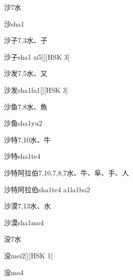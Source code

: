 \begin{entry}{沙}{7}{⽔}
  \begin{phonetics}{沙}{sha1}
  \end{phonetics}
\end{entry}

\begin{entry}{沙子}{7,3}{⽔、⼦}
  \begin{phonetics}{沙子}{sha1 zi5}[][HSK 3]
  \end{phonetics}
\end{entry}

\begin{entry}{沙发}{7,5}{⽔、⼜}
  \begin{phonetics}{沙发}{sha1fa1}[][HSK 3]
  \end{phonetics}
\end{entry}

\begin{entry}{沙鱼}{7,8}{⽔、⿂}
  \begin{phonetics}{沙鱼}{sha1yu2}
  \end{phonetics}
\end{entry}

\begin{entry}{沙特}{7,10}{⽔、⽜}
  \begin{phonetics}{沙特}{sha1te4}
  \end{phonetics}
\end{entry}

\begin{entry}{沙特阿拉伯}{7,10,7,8,7}{⽔、⽜、⾩、⼿、⼈}
  \begin{phonetics}{沙特阿拉伯}{sha1te4 a1la1bo2}
  \end{phonetics}
\end{entry}

\begin{entry}{沙漠}{7,13}{⽔、⽔}
  \begin{phonetics}{沙漠}{sha1mo4}
  \end{phonetics}
\end{entry}

\begin{entry}{没}{7}{⽔}
  \begin{phonetics}{没}{mei2}[][HSK 1]
  \end{phonetics}
  \begin{phonetics}{没}{mo4}
  \end{phonetics}
\end{entry}

